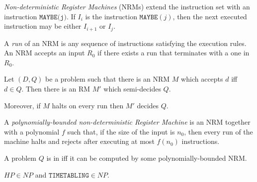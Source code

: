 \documentclass{article}
\begin{document}
\begin{definition}
    \emph{Non-deterministic Register Machines} (NRMs) extend the instruction set with an instruction 
    $\texttt{MAYBE(j)}$. If $I_i$ is the instruction $\texttt{MAYBE}(j)$, then the next executed instruction 
    may be either $I_{i+1}$ or $I_j$.

    A \emph{run} of an NRM is any sequence of instructions satisfying the execution rules. An NRM accepts 
    an input $R_0$ if there exists a run that terminates with a one in $R_0$.
\end{definition}

\begin{theorem}[Notes II.10]
    Let $(D,Q)$ be a problem such that there is an NRM $M$ which accepts $d$ iff $d\in Q$.
    Then there is an RM $M'$ which semi-decides $Q$.
    
    Moreover, if $M$ halts on every run then $M'$ decides $Q$.
\end{theorem}

\begin{definition}
    A \emph{polynomially-bounded non-deterministic Register Machine} is an NRM together with a polynomial
    $f$ such that, if the size of the input is $n_0$, then every run of the machine halts and 
    rejects after executing at most $f(n_0)$ instructions.

    A problem $Q$ is in \nptime iff it can be computed by some polynomially-bounded NRM.
\end{definition}

\begin{theorem}[Notes II.12]
    $HP\in NP$ and $\texttt{TIMETABLING}\in NP$.
\end{theorem}
\end{document}
